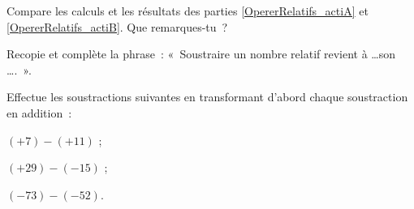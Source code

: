 \begin{activite}
\begin{partie}
Compare les calculs et les résultats des parties \ref{OpererRelatifs_actiA} et \ref{OpererRelatifs_actiB}. Que remarques-tu ?

Recopie et complète la phrase : « Soustraire un nombre relatif revient à \ldots son \ldots . ».
\end{partie}

\begin{partie}
Effectue les soustractions suivantes en transformant d'abord chaque soustraction en addition :
\begin{colenumerate}{3}
 \item $(+ 7) - (+ 11)$ ;
 \item $(+ 29) - (- 15)$ ;
 \item $(- 73) - (- 52)$.
 \end{colenumerate}
\end{partie}

\end{activite}



